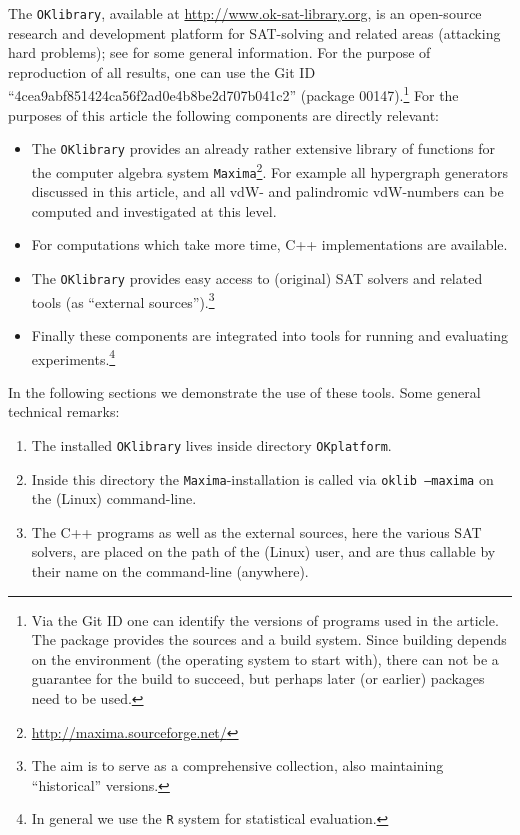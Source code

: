 \documentclass[final,3p,times]{elsarticle}
\theoremstyle{definition}
\newcommand{\OKlibrary}{\texttt{OKlibrary}}
\newcommand{\OKinternet}{\url{http://www.ok-sat-library.org}}
\begin{document}
\begin{appendix}
The \OKlibrary, available at \OKinternet, is an open-source research and development platform for SAT-solving and related areas (attacking hard problems); see \cite{Kullmann2009OKlibrary} for some general information. For the purpose of reproduction of all results, one can use the Git ID ``4cea9abf851424ca56f2ad0e4b8be2d707b041c2'' (package 00147).\footnote{Via the Git ID one can identify the versions of programs used in the article. The package provides the sources and a build system. Since building depends on the environment (the operating system to start with), there can not be a guarantee for the build to succeed, but perhaps later (or earlier) packages need to be used.} For the purposes of this article the following components are directly relevant:
\begin{itemize}
\item The \OKlibrary{} provides an already rather extensive library of functions for the computer algebra system \texttt{Maxima}\footnote{\url{http://maxima.sourceforge.net/}}. For example all hypergraph generators discussed in this article, and all vdW- and palindromic vdW-numbers can be computed and investigated at this level.
\item For computations which take more time, C++ implementations are available.
\item The \OKlibrary{} provides easy access to (original) SAT solvers and related tools (as ``external sources'').\footnote{The aim is to serve as a comprehensive collection, also maintaining ``historical'' versions.}
\item Finally these components are integrated into tools for running and evaluating experiments.\footnote{In general we use the \texttt{R} system for statistical evaluation.}
\end{itemize}
In the following sections we demonstrate the use of these tools. Some general technical remarks:
\begin{enumerate}
\item The installed \OKlibrary{} lives inside directory \texttt{OKplatform}.
\item Inside this directory the \texttt{Maxima}-installation is called via \texttt{oklib --maxima} on the (Linux) command-line.
\item The C++ programs as well as the external sources, here the various SAT solvers, are placed on the path of the (Linux) user, and are thus callable by their name on the command-line (anywhere).
\end{enumerate}




\end{appendix}
\end{document}
